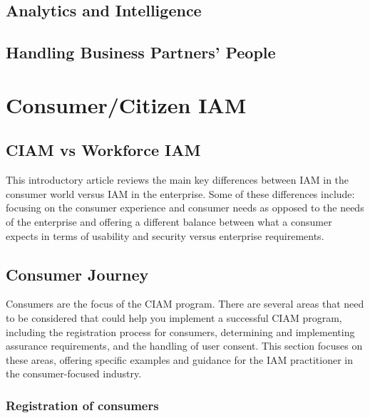 \hypertarget{analytics-and-intelligence}{%
\section{Analytics and
Intelligence}\label{analytics-and-intelligence}}

\hypertarget{handling-business-partners-people}{%
\section{Handling Business Partners'
People}\label{handling-business-partners-people}}

\hypertarget{consumercitizen-iam}{%
\chapter{Consumer/Citizen IAM}\label{consumercitizen-iam}}

\hypertarget{ciam-vs-workforce-iam}{%
\section{CIAM vs Workforce IAM}\label{ciam-vs-workforce-iam}}

This introductory article reviews the main key differences between IAM
in the consumer world versus IAM in the enterprise. Some of these
differences include: focusing on the consumer experience and consumer
needs as opposed to the needs of the enterprise and offering a different
balance between what a consumer expects in terms of usability and
security versus enterprise requirements.

\hypertarget{consumer-journey}{%
\section{Consumer Journey}\label{consumer-journey}}

Consumers are the focus of the CIAM program. There are several areas
that need to be considered that could help you implement a successful
CIAM program, including the registration process for consumers,
determining and implementing assurance requirements, and the handling of
user consent. This section focuses on these areas, offering specific
examples and guidance for the IAM practitioner in the consumer-focused
industry.

\hypertarget{registration-of-consumers}{%
\subsection{Registration of
consumers}\label{registration-of-consumers}}

